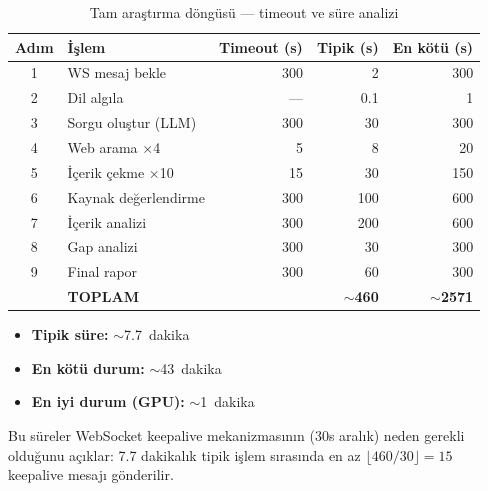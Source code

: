 \begin{table}[H]
\centering
\caption{Tam ara\c{s}t{\i}rma d\"{o}ng\"{u}s\"{u} --- timeout ve s\"{u}re analizi}
\label{tab:full-cycle}
\begin{tabularx}{\textwidth}{clrrr}
\toprule
\color{chapterBlue}\textbf{Ad{\i}m} & \color{chapterBlue}\textbf{\.{I}\c{s}lem} & \color{chapterBlue}\textbf{Timeout (s)} & \color{chapterBlue}\textbf{Tipik (s)} & \color{chapterBlue}\textbf{En k\"{o}t\"{u} (s)} \\
\midrule
1 & WS mesaj bekle        & 300  & 2    & 300 \\
2 & Dil alg{\i}la            & ---  & 0.1  & 1 \\
3 & Sorgu olu\c{s}tur (LLM)  & 300  & 30   & 300 \\
4 & Web arama $\times$4    & 5    & 8    & 20 \\
5 & \.{I}\c{c}erik \c{c}ekme $\times$10 & 15   & 30   & 150 \\
6 & Kaynak de\u{g}erlendirme  & 300  & 100  & 600 \\
7 & \.{I}\c{c}erik analizi      & 300  & 200  & 600 \\
8 & Gap analizi            & 300  & 30   & 300 \\
9 & Final rapor            & 300  & 60   & 300 \\
\midrule
  & \textbf{TOPLAM}        &      & \textbf{$\sim$460} & \textbf{$\sim$2571} \\
\bottomrule
\end{tabularx}
\end{table}

\begin{itemize}
  \item \textbf{Tipik s\"{u}re:} $\sim$7.7~dakika
  \item \textbf{En k\"{o}t\"{u} durum:} $\sim$43~dakika
  \item \textbf{En iyi durum (GPU):} $\sim$1~dakika
\end{itemize}

Bu s\"{u}reler WebSocket keepalive mekanizmas{\i}n{\i}n (30s aral{\i}k) neden gerekli oldu\u{g}unu a\c{c}{\i}klar: 7.7 dakikal{\i}k tipik i\c{s}lem s{\i}ras{\i}nda en az $\lfloor 460/30 \rfloor = 15$ keepalive mesaj{\i} g\"{o}nderilir.



